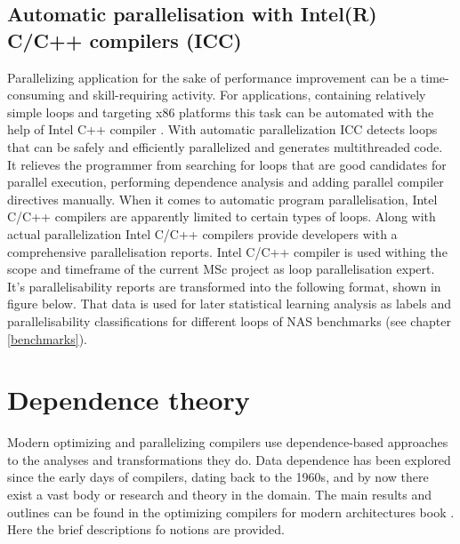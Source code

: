 \subsection{Automatic parallelisation with Intel(R) C/C++ compilers (ICC)}
\qquad Parallelizing application for the sake of performance improvement can be a time-consuming and skill-requiring activity. For applications, containing relatively simple loops and targeting x86 platforms this task can be automated with the help of Intel C++ compiler \cite{intel-multithreading-guide}. With automatic parallelization ICC detects loops that can be safely and efficiently parallelized and generates multithreaded code. It relieves the programmer from searching for loops that are good candidates for parallel execution, performing dependence analysis and adding parallel compiler directives manually. \newline \null\qquad When it comes to automatic program parallelisation, Intel C/C++ compilers are apparently limited to certain types of loops. \newline \null\qquad Along with actual parallelization Intel C/C++ compilers provide developers with a comprehensive parallelisation reports. \newline \null\qquad Intel C/C++ compiler is used withing the scope and timeframe of the current MSc project as loop parallelisation expert. It's parallelisability reports are transformed into the following format, shown in figure below. That data is used for later statistical learning analysis as labels and parallelisability classifications for different loops of NAS benchmarks (see chapter \ref{benchmarks}).      
   

\section{Dependence theory} \label{background-dependence-theory}
\qquad Modern optimizing and parallelizing compilers use dependence-based approaches to the analyses and transformations they do. Data dependence has been explored since the early days of compilers, dating back to the 1960s, and by now there exist a vast body or research and theory in the domain. The main results and outlines can be found in the optimizing compilers for modern architectures book \cite{optimizing-compilers-book}. Here the brief descriptions fo notions are provided.  
